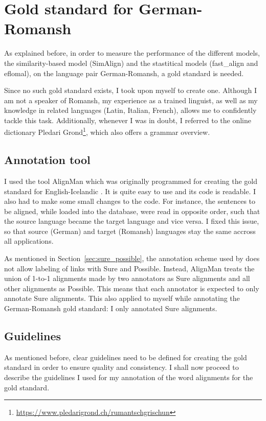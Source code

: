 \section{Gold standard for German-Romansh}
As explained before, in order to measure the performance of the different models, the similarity-based model (SimAlign) and the stastitical models (fast\_align and eflomal), on the language pair German-Romansh, a gold standard is needed. 

Since no such gold standard exists, I took upon myself to create one. 
Although I am not a speaker of Romansh, my experience as a trained linguist, as well as my knowledge in related languages (Latin, Italian, French), allows me to confidently tackle this task. 
Additionally, whenever I was in doubt, I referred to the online dictionary Pledari Grond\footnote{\url{https://www.pledarigrond.ch/rumantschgrischun}}, which also offers a grammar overview. 

\subsection{Annotation tool}
\label{sec:AlignMan}
I used the tool AlignMan which was originally programmed for creating the gold standard for English-Icelandic \autocite{steingrimsson-etal-2021-combalign}. 
It is quite easy to use and its code is readable. 
I also had to make some small changes to the code. 
For instance, the sentences to be aligned, while loaded into the database, were read in opposite order, such that the source language became the target language and vice versa. 
I fixed this issue, so that source (German) and target (Romansh) languages stay the same accross all applications.

As mentioned in Section~\ref{sec:sure_possible}, the annotation scheme used by \textcite{steingrimsson-etal-2021-combalign} does not allow labeling of links with Sure and Possible. 
Instead, AlignMan treats the union of 1-to-1 alignments made by two annotators as Sure alignments and all other alignments as Possible. 
This means that each annotator is expected to only annotate Sure alignments. This also applied to myself while annotating the German-Romansh gold standard: I only annotated Sure alignments. 


\subsection{Guidelines}
As mentioned before, clear guidelines need to be defined for creating the gold standard in order to ensure quality and consistency. I shall now proceed to describe the guidelines I used for my annotation of the word alignments for the gold standard.

